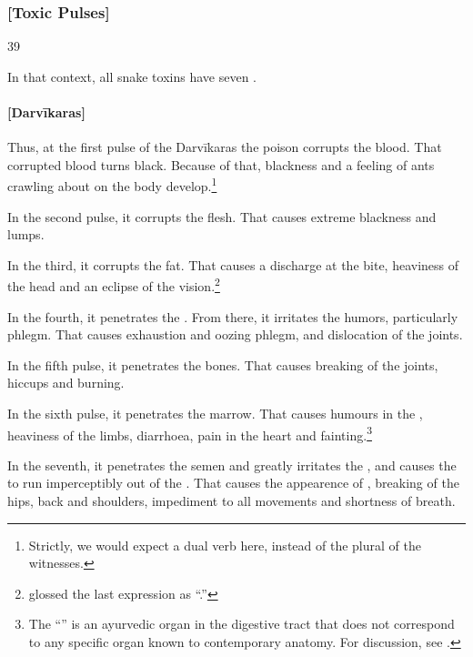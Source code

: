 \begin{translation}
\subsubsection{[Toxic Pulses]}

\item[39]

In that context, all snake toxins have seven .  

\paragraph{[Darvīkaras]}   

Thus, at the first pulse of the Darvīkaras the poison corrupts the blood.
That corrupted blood turns black.  Because of that, blackness and a
feeling of ants crawling about on the body develop.\footnote{Strictly, we
    would expect a dual verb here, instead of the plural of the witnesses.}

In the second pulse, it corrupts the flesh.  That causes extreme blackness and  
lumps. 

In the third, it corrupts the fat. That causes a discharge at the bite,
heaviness of the head and an eclipse of the
vision.\footnote{ glossed the last expression as
    “.”}
    

In the fourth, it penetrates the .  From there, it 
irritates the humors, particularly phlegm. That causes exhaustion and oozing 
phlegm, and dislocation of the joints.

In the fifth pulse, it penetrates the bones.  That causes breaking of the joints, 
hiccups 
and burning.

In the sixth pulse, it penetrates the marrow.  That causes humours in the
, heaviness of the limbs, diarrhoea,
pain in the heart and fainting.\footnote{The “” is an ayurvedic organ in the digestive tract that does not
    correspond to any specific organ known to contemporary anatomy.  For
    discussion, see \cites[v.\,1,
    304]{josi-maha}[619]{meul-1974}[544--545]{das-2003}.}
    
In the seventh, it penetrates the semen and greatly irritates the
, and  causes the  to run
imperceptibly out of the .  That causes the appearence
of , breaking of the hips, back and shoulders, impediment 
to all movements and shortness of breath.
    

\end{translation}

